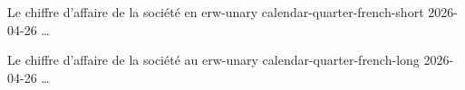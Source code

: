 \documentclass{article}
\begin{document}
Le chiffre d'affaire de la société en
\UseInstance
{erw-unary}
{calendar-quarter-french-short}
{2026-04-26} \dots

Le chiffre d'affaire de la société au
\UseInstance
{erw-unary}
{calendar-quarter-french-long}
{2026-04-26} \dots
\end{document}
